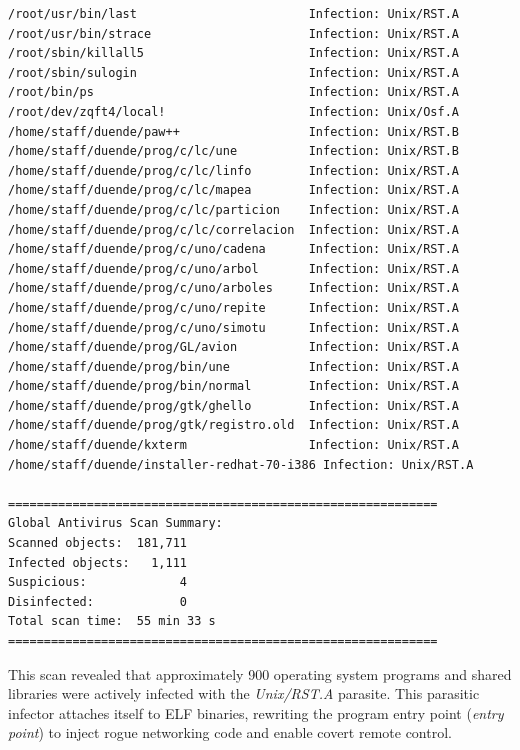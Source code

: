 \begin{lstlisting}[style=terminal,caption={Excerpt of infections detected by antivirus scanning on the target system.},label={lst:fprot_results}]
/root/usr/bin/last                        Infection: Unix/RST.A
/root/usr/bin/strace                      Infection: Unix/RST.A
/root/sbin/killall5                       Infection: Unix/RST.A
/root/sbin/sulogin                        Infection: Unix/RST.A
/root/bin/ps                              Infection: Unix/RST.A
/root/dev/zqft4/local!                    Infection: Unix/Osf.A
/home/staff/duende/paw++                  Infection: Unix/RST.B
/home/staff/duende/prog/c/lc/une          Infection: Unix/RST.B
/home/staff/duende/prog/c/lc/linfo        Infection: Unix/RST.A
/home/staff/duende/prog/c/lc/mapea        Infection: Unix/RST.A
/home/staff/duende/prog/c/lc/particion    Infection: Unix/RST.A
/home/staff/duende/prog/c/lc/correlacion  Infection: Unix/RST.A
/home/staff/duende/prog/c/uno/cadena      Infection: Unix/RST.A
/home/staff/duende/prog/c/uno/arbol       Infection: Unix/RST.A
/home/staff/duende/prog/c/uno/arboles     Infection: Unix/RST.A
/home/staff/duende/prog/c/uno/repite      Infection: Unix/RST.A
/home/staff/duende/prog/c/uno/simotu      Infection: Unix/RST.A
/home/staff/duende/prog/GL/avion          Infection: Unix/RST.A
/home/staff/duende/prog/bin/une           Infection: Unix/RST.A
/home/staff/duende/prog/bin/normal        Infection: Unix/RST.A
/home/staff/duende/prog/gtk/ghello        Infection: Unix/RST.A
/home/staff/duende/prog/gtk/registro.old  Infection: Unix/RST.A
/home/staff/duende/kxterm                 Infection: Unix/RST.A
/home/staff/duende/installer-redhat-70-i386 Infection: Unix/RST.A

============================================================
Global Antivirus Scan Summary:
Scanned objects:  181,711
Infected objects:   1,111
Suspicious:             4
Disinfected:            0
Total scan time:  55 min 33 s
============================================================
\end{lstlisting}

This scan revealed that approximately 900 operating system programs and shared libraries were actively infected with the \textit{Unix/RST.A} parasite. This parasitic infector attaches itself to ELF binaries, rewriting the program entry point (\textit{entry point}) to inject rogue networking code and enable covert remote control.

